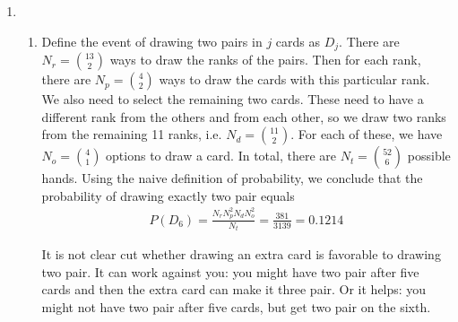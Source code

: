 \begin{exercise}
	\begin{solution}
		\begin{enumerate}
			\item 
			\begin{enumerate}
				\item Define the event of drawing two pairs in $j$ cards as $D_j$. There are $N_{r} = {13 \choose 2}$ ways to draw the ranks of the pairs. Then for each rank, there are $N_{p}={4 \choose 2}$ ways to draw the cards with this particular rank. We also need to select the remaining two cards. These need to have a different rank from the others and from each other, so we draw two ranks from the remaining 11 ranks, i.e. $N_{d} = {11 \choose 2}$. For each of these, we have $N_{o} = {4 \choose 1}$ options to draw a card. 
				In total, there are $N_{t} = {52 \choose 6}$ possible hands. Using the naive definition of probability, we conclude that the probability of drawing exactly two pair equals
				\begin{align*}
					P(D_{6}) = \frac{N_{r}N_{p}^2 N_{d} N_{o}^2}{N_{t}} = \frac{381}{3139}=0.1214
				\end{align*} 
				
				
				It is not clear cut whether drawing an extra card is favorable to drawing two pair. It can work against you: you might have two pair after five cards and then the extra card can make it three pair. Or it helps: you might not have two pair after five cards, but get two pair on the sixth. 
				

\end{enumerate}
\end{enumerate}
\end{solution}
\end{exercise}

